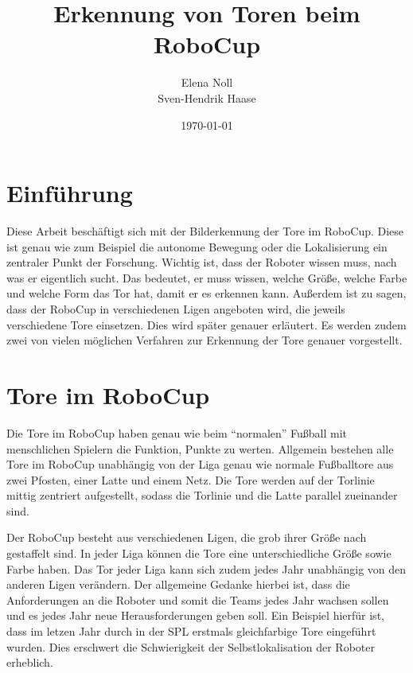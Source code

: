 \documentclass[a4paper,12pt]{article}
\begin{document}
\renewcommand\bibname{Referenzen}
\renewcommand\refname{Referenzen}

\begin{titlepage}
    \author{Elena Noll\\
    Sven-Hendrik Haase}
    \title{Erkennung von Toren beim RoboCup} 
    \date{\today} 
    \maketitle
    \thispagestyle{empty}
\end{titlepage}

\tableofcontents

\newpage

\section{Einführung}
Diese Arbeit beschäftigt sich mit der Bilderkennung der Tore im RoboCup.
Diese ist genau wie zum Beispiel die autonome Bewegung oder die Lokalisierung ein zentraler Punkt
der Forschung.
Wichtig ist, dass der Roboter wissen muss, nach was er eigentlich sucht. Das bedeutet, er muss wissen, 
welche Größe, welche Farbe und welche Form das Tor hat, damit er es erkennen kann.
Außerdem ist zu sagen, dass der RoboCup in verschiedenen Ligen
angeboten wird, die jeweils verschiedene Tore einsetzen. Dies wird später
genauer erläutert. Es werden zudem zwei von vielen möglichen Verfahren zur Erkennung
der Tore genauer vorgestellt.

\section{Tore im RoboCup}
Die Tore im RoboCup haben genau wie beim "`normalen"' Fußball mit menschlichen
Spielern die Funktion, Punkte zu werten.
Allgemein bestehen alle Tore im RoboCup unabhängig von der Liga genau wie normale Fußballtore aus zwei Pfosten, einer Latte und einem Netz. Die Tore werden auf der Torlinie mittig zentriert aufgestellt, sodass die Torlinie und die Latte parallel zueinander sind.

Der RoboCup besteht aus verschiedenen Ligen, die grob ihrer Größe nach
gestaffelt sind. In jeder Liga können die Tore eine unterschiedliche Größe sowie Farbe haben. Das Tor jeder Liga kann sich zudem jedes Jahr unabhängig von den
anderen Ligen verändern. Der allgemeine Gedanke hierbei ist, dass die
Anforderungen an die Roboter und somit die Teams jedes Jahr wachsen sollen und es jedes Jahr neue
Herausforderungen geben soll. Ein Beispiel hierfür ist, dass im letzen Jahr durch in der SPL erstmals
gleichfarbige Tore eingeführt wurden.
Dies erschwert die Schwierigkeit der Selbstlokalisation der Roboter erheblich.
\end{document}
